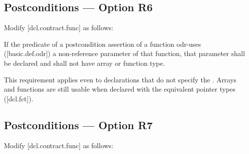\subsection*{Postconditions --- Option R6}

Modify [dcl.contract.func] as follows:

\begin{adjustwidth}{0.5cm}{0.5cm}
If the predicate of a postcondition assertion of a function odr-uses ([basic.def.odr]) a
non-reference parameter of that function, that parameter shall be declared  and shall not have array or function type. 
\begin{note}
This requirement applies even to declarations
that do not specify the . Arrays and functions are still usable when declared with the equivalent pointer types ([dcl.fct]).
\end{note}
\begin{example}
\tcode{[...]}
\end{example}

\end{adjustwidth}

\subsection*{Postconditions --- Option R7}

Modify [dcl.contract.func] as follows:


